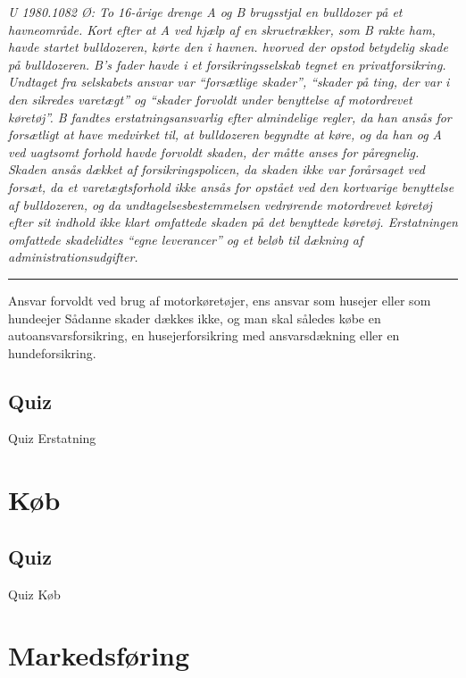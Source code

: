 \documentclass[]{book}
\begin{document}
\emph{U 1980.1082 Ø: To 16-årige drenge A og B brugsstjal en bulldozer på et havneområde. Kort efter at A ved hjælp af en skruetrækker, som B rakte ham, havde startet bulldozeren, kørte den i havnen. hvorved der opstod betydelig skade på bulldozeren. B's fader havde i et forsikringsselskab tegnet en privatforsikring. Undtaget fra selskabets ansvar var ``forsætlige skader'', ``skader på ting, der var i den sikredes varetægt'' og ``skader forvoldt under benyttelse af motordrevet køretøj''. B fandtes erstatningsansvarlig efter almindelige regler, da han ansås for forsætligt at have medvirket til, at bulldozeren begyndte at køre, og da han og A ved uagtsomt forhold havde forvoldt skaden, der måtte anses for påregnelig. Skaden ansås dækket af forsikringspolicen, da skaden ikke var forårsaget ved forsæt, da et varetægtsforhold ikke ansås for opstået ved den kortvarige benyttelse af bulldozeren, og da undtagelsesbestemmelsen vedrørende motordrevet køretøj efter sit indhold ikke klart omfattede skaden på det benyttede køretøj. Erstatningen omfattede skadelidtes ``egne leverancer'' og et beløb til dækning af administrationsudgifter.}

\begin{center}\rule{0.5\linewidth}{\linethickness}\end{center}

Ansvar forvoldt ved brug af motorkøretøjer, ens ansvar som husejer eller som hundeejer
Sådanne skader dækkes ikke, og man skal således købe en autoansvarsforsikring, en husejerforsikring med ansvarsdækning eller en hundeforsikring.

\hypertarget{quiz-1}{%
\section{Quiz}\label{quiz-1}}

Quiz Erstatning

\hypertarget{kb}{%
\chapter{Køb}\label{kb}}

\hypertarget{quiz-2}{%
\section{Quiz}\label{quiz-2}}

Quiz Køb

\hypertarget{markedsfring}{%
\chapter{Markedsføring}\label{markedsfring}}
\end{document}
